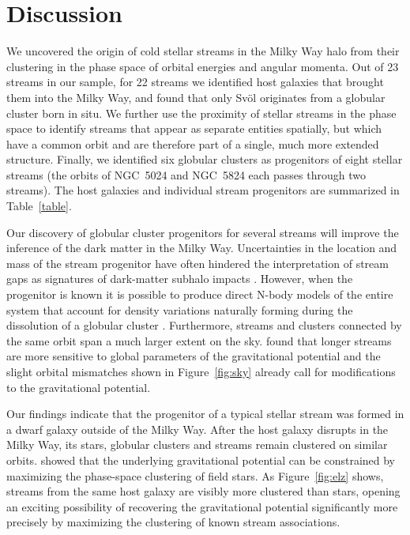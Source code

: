 \documentclass[twocolumn]{aastex63}
\begin{document}

\section{Discussion}
\label{sec:discussion}
We uncovered the origin of cold stellar streams in the Milky Way halo from their clustering in the phase space of orbital energies and angular momenta.
Out of 23 streams in our sample, for 22 streams we identified host galaxies that brought them into the Milky Way, and found that only Sv\" ol originates from a globular cluster born in situ.
We further use the proximity of stellar streams in the phase space to identify streams that appear as separate entities spatially, but which have a common orbit and are therefore part of a single, much more extended structure.
Finally, we identified six globular clusters as progenitors of eight stellar streams (the orbits of NGC~5024 and NGC~5824 each passes through two streams).
The host galaxies and individual stream progenitors are summarized in Table~\ref{table}.

Our discovery of globular cluster progenitors for several streams will improve the inference of the dark matter in the Milky Way.
Uncertainties in the location and mass of the stream progenitor have often hindered the interpretation of stream gaps as signatures of dark-matter subhalo impacts \citep{banik2019}.
However, when the progenitor is known it is possible to produce direct N-body models of the entire system that account for density variations naturally forming during the dissolution of a globular cluster \citep[e.g.,][]{kuepper2015}.
Furthermore, streams and clusters connected by the same orbit span a much larger extent on the sky.
\citet{bh2018} found that longer streams are more sensitive to global parameters of the gravitational potential and the slight orbital mismatches shown in Figure~\ref{fig:sky} already call for modifications to the gravitational potential.

Our findings indicate that the progenitor of a typical stellar stream was formed in a dwarf galaxy outside of the Milky Way.
After the host galaxy disrupts in the Milky Way, its stars, globular clusters and streams remain clustered on similar orbits.
\citet{sanderson2015} showed that the underlying gravitational potential can be constrained by maximizing the phase-space clustering of field stars.
As Figure~\ref{fig:elz} shows, streams from the same host galaxy are visibly more clustered than stars, opening an exciting possibility of recovering the gravitational potential significantly more precisely by maximizing the clustering of known stream associations.
\end{document}
